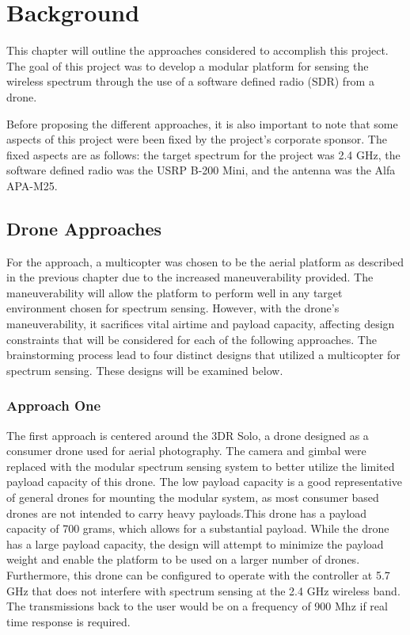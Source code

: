 \chapter{Background}
This chapter will outline the approaches considered to accomplish this project. The goal of this project was to develop a modular platform for sensing the wireless spectrum through the use of a software defined radio (SDR) from a drone.

Before proposing the different approaches, it is also important to note that some aspects of this project were been fixed by the project’s corporate sponsor. The fixed aspects are as follows: the target spectrum for the project was 2.4 GHz, the software defined radio was the USRP B-200 Mini, and the antenna was the Alfa APA-M25.


\section{Drone Approaches}
For the approach, a multicopter was chosen to be the aerial platform as described in the previous chapter due to the increased maneuverability provided. The maneuverability will allow the platform to perform well in any target environment chosen for spectrum sensing. However, with the drone’s maneuverability, it sacrifices vital airtime and payload capacity, affecting design constraints that will be considered for each of the following approaches. The brainstorming process lead to four distinct designs that utilized a multicopter for spectrum sensing. These designs will be examined below.

\subsection{Approach One}
The first approach is centered around the 3DR Solo, a drone designed as a consumer drone used for aerial photography. The camera and gimbal were replaced with the modular spectrum sensing system to better utilize the limited payload capacity of this drone. The low payload capacity is a good representative of general drones for mounting the modular system, as most consumer based drones are not intended to carry heavy payloads.This drone has a payload capacity of 700 grams, which allows for a substantial payload. While the drone has a large payload capacity, the design will attempt to minimize the payload weight and enable the platform to be used on a larger number of drones. Furthermore, this drone can be configured to operate with the controller at 5.7 GHz that does not interfere with spectrum sensing at the 2.4 GHz wireless band. The transmissions back to the user would be on a frequency of 900 Mhz if real time response is required.
